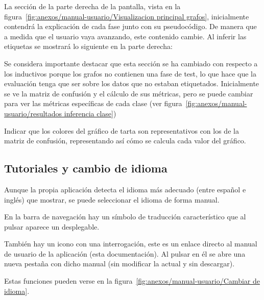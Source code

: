 
La sección de la parte derecha de la pantalla, vista en la figura~\ref{fig:anexos/manual-usuario/Visualizacion principal grafos}, inicialmente contendrá la explicación de cada fase junto con su pseudocódigo. De manera que a medida que el usuario vaya avanzando, este contenido cambie. Al inferir las etiquetas se mostrará lo siguiente en la parte derecha:


Se considera importante destacar que esta sección se ha cambiado con respecto a los inductivos porque los grafos no contienen una fase de test, lo que hace que la evaluación tenga que ser sobre los datos que no estaban etiquetados. Inicialmente se ve la matriz de confusión y el cálculo de sus métricas, pero se puede cambiar para ver las métricas específicas de cada clase (ver figura~\ref{fig:anexos/manual-usuario/resultados inferencia clase}) 


Indicar que los colores del gráfico de tarta son representativos con los de la matriz de confusión, representando así cómo se calcula cada valor del gráfico.
\subsection{Tutoriales y cambio de idioma}

Aunque la propia aplicación detecta el idioma más adecuado (entre español e inglés) que mostrar, se puede seleccionar el idioma de forma manual.

En la barra de navegación hay un símbolo de traducción característico que al pulsar aparece un desplegable.

También hay un icono con una interrogación, este es un enlace directo al manual de usuario de la aplicación (esta documentación). Al pulsar en él se abre una nueva pestaña con dicho manual (sin modificar la actual y sin descargar).

Estas funciones pueden verse en la figura~\ref{fig:anexos/manual-usuario/Cambiar
de idioma}.


